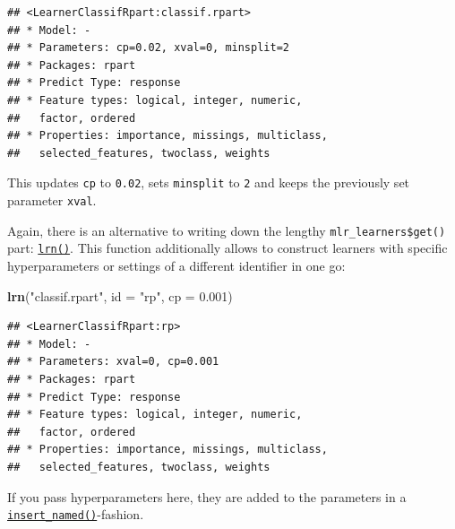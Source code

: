 \documentclass[]{article}
\newenvironment{Shaded}{\begin{snugshade}}{\end{snugshade}}
\newcommand{\DataTypeTok}[1]{\textcolor[rgb]{0.13,0.29,0.53}{#1}}
\newcommand{\DecValTok}[1]{\textcolor[rgb]{0.00,0.00,0.81}{#1}}
\newcommand{\FloatTok}[1]{\textcolor[rgb]{0.00,0.00,0.81}{#1}}
\newcommand{\KeywordTok}[1]{\textcolor[rgb]{0.13,0.29,0.53}{\textbf{#1}}}
\newcommand{\NormalTok}[1]{#1}
\newcommand{\OperatorTok}[1]{\textcolor[rgb]{0.81,0.36,0.00}{\textbf{#1}}}
\newcommand{\StringTok}[1]{\textcolor[rgb]{0.31,0.60,0.02}{#1}}
\renewenvironment{Shaded} {\begin{snugshade}\small} {\end{snugshade}}
\begin{document}
\begin{Shaded}
\end{Shaded}

\begin{verbatim}
## <LearnerClassifRpart:classif.rpart>
## * Model: -
## * Parameters: cp=0.02, xval=0, minsplit=2
## * Packages: rpart
## * Predict Type: response
## * Feature types: logical, integer, numeric,
##   factor, ordered
## * Properties: importance, missings, multiclass,
##   selected_features, twoclass, weights
\end{verbatim}

This updates \texttt{cp} to \texttt{0.02}, sets \texttt{minsplit} to \texttt{2} and keeps the previously set parameter \texttt{xval}.

Again, there is an alternative to writing down the lengthy \texttt{mlr\_learners\$get()} part: \href{https://mlr3.mlr-org.com/reference/mlr_sugar.html}{\texttt{lrn()}}.
This function additionally allows to construct learners with specific hyperparameters or settings of a different identifier in one go:

\begin{Shaded}
\begin{Highlighting}[]
\KeywordTok{lrn}\NormalTok{(}\StringTok{"classif.rpart"}\NormalTok{, }\DataTypeTok{id =} \StringTok{"rp"}\NormalTok{, }\DataTypeTok{cp =} \FloatTok{0.001}\NormalTok{)}
\end{Highlighting}
\end{Shaded}

\begin{verbatim}
## <LearnerClassifRpart:rp>
## * Model: -
## * Parameters: xval=0, cp=0.001
## * Packages: rpart
## * Predict Type: response
## * Feature types: logical, integer, numeric,
##   factor, ordered
## * Properties: importance, missings, multiclass,
##   selected_features, twoclass, weights
\end{verbatim}

If you pass hyperparameters here, they are added to the parameters in a \href{https://mlr3misc.mlr-org.com/reference/insert_named.html}{\texttt{insert\_named()}}-fashion.
\end{document}
